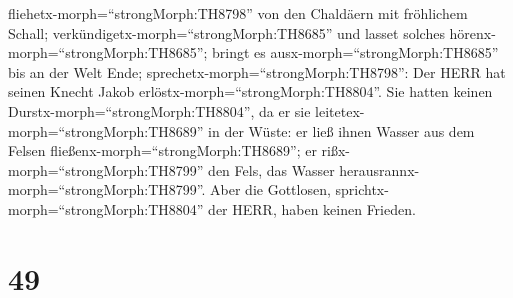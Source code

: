 fliehetx-morph=``strongMorph:TH8798'' von den Chaldäern mit fröhlichem
Schall; verkündigetx-morph=``strongMorph:TH8685'' und lasset solches
hörenx-morph=``strongMorph:TH8685''; bringt es
ausx-morph=``strongMorph:TH8685'' bis an der Welt Ende;
sprechetx-morph=``strongMorph:TH8798'': Der HERR hat seinen Knecht Jakob
erlöstx-morph=``strongMorph:TH8804''.  Sie hatten keinen
Durstx-morph=``strongMorph:TH8804'', da er sie
leitetex-morph=``strongMorph:TH8689'' in der Wüste: er ließ ihnen Wasser
aus dem Felsen fließenx-morph=``strongMorph:TH8689''; er
rißx-morph=``strongMorph:TH8799'' den Fels, das Wasser
herausrannx-morph=``strongMorph:TH8799''.  Aber die
Gottlosen, sprichtx-morph=``strongMorph:TH8804'' der HERR, haben keinen
Frieden.

\hypertarget{section-48}{%
\section{49}\label{section-48}}

